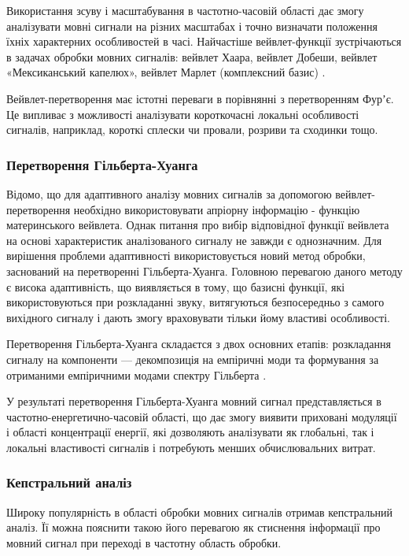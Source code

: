 Використання зсуву і масштабування в частотно-часовій області дає змогу аналізувати мовні сигнали на різних масштабах і точно визначати положення їхніх характерних особливостей в часі. Найчастіше вейвлет-функції зустрічаються в задачах обробки мовних сигналів: вейвлет Хаара, вейвлет Добеши, вейвлет «Мексиканський капелюх», вейвлет Марлет (комплексний базис) \cite{Майдан_2007}.

Вейвлет-перетворення має істотні переваги в порівнянні з перетворенням Фурʼє. Це випливає з можливості аналізувати короткочасні локальні особливості сигналів, наприклад, короткі сплески чи провали, розриви та сходинки тощо.

\subsubsection{Перетворення Гільберта-Хуанга}

Відомо, що для адаптивного аналізу мовних сигналів за допомогою вейвлет-перетворення необхідно використовувати апріорну інформацію - функцію материнського вейвлета. Однак питання про вибір відповідної функції вейвлета на основі характеристик аналізованого сигналу не завжди є однозначним. Для вирішення проблеми адаптивності використовується новий метод обробки, заснований на перетворенні Гільберта-Хуанга. Головною перевагою даного методу є висока адаптивність, що виявляється в тому, що базисні функції, які використовуються при розкладанні звуку, витягуються безпосередньо з самого вихідного сигналу і дають змогу враховувати тільки йому властиві особливості.

Перетворення Гільберта-Хуанга складаєтся з двох основних етапів: розкладання сигналу на компоненти --- декомпозиція на емпіричні моди \cite{Huang_1998,Tychkov_2013} та формування за отриманими емпіричними модами спектру Гільберта \cite{Huang_2013}.

У результаті перетворення Гільберта-Хуанга мовний сигнал представляється в частотно-енергетично-часовій області, що дає змогу виявити приховані модуляції і області концентрації енергії, які дозволяють аналізувати як глобальні, так і локальні властивості сигналів і потребують менших обчислювальних витрат.

\subsubsection{Кепстральний аналіз}

Широку популярність в області обробки мовних сигналів отримав кепстральний аналіз. Її можна пояснити такою його перевагою як стиснення інформації про мовний сигнал при переході в частотну область обробки.

